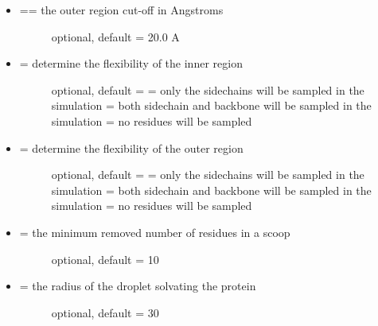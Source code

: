 \documentclass[letterpaper,10pt,english]{sphinxmanual}
\begin{document}
\begin{itemize}
\item {} \begin{description}
\item[{ == the outer region cut-off in Angstroms}] \leavevmode
optional, default = 20.0 A

\end{description}

\item {} \begin{description}
\item[{ = determine the flexibility of the inner region}] \leavevmode
optional, default = 
 = only the sidechains will be sampled in the simulation
 = both sidechain and backbone will be sampled in the simulation
 = no residues will be sampled

\end{description}

\item {} \begin{description}
\item[{ = determine the flexibility of the outer region}] \leavevmode
optional, default = 
 = only the sidechains will be sampled in the simulation
 = both sidechain and backbone will be sampled in the simulation
 = no residues will be sampled

\end{description}

\item {} \begin{description}
\item[{ = the minimum removed number of residues in a scoop}] \leavevmode
optional, default = 10

\end{description}

\item {} \begin{description}
\item[{ = the radius of the droplet solvating the protein}] \leavevmode
optional, default = 30


\end{description}
\end{itemize}
\end{document}
